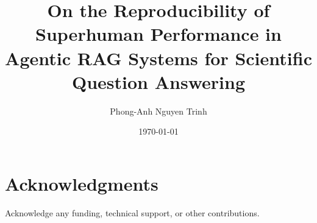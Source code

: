 \documentclass[12pt,a4paper]{article}
\title{\textbf{On the Reproducibility of Superhuman Performance in Agentic RAG Systems for Scientific Question Answering}}
\author[1]{Phong-Anh Nguyen Trinh}
\affil[1]{Department of Physics, University of Cambridge}
\date{\today}
\begin{document}
\maketitle







\section*{Acknowledgments}
Acknowledge any funding, technical support, or other contributions.



\end{document}
